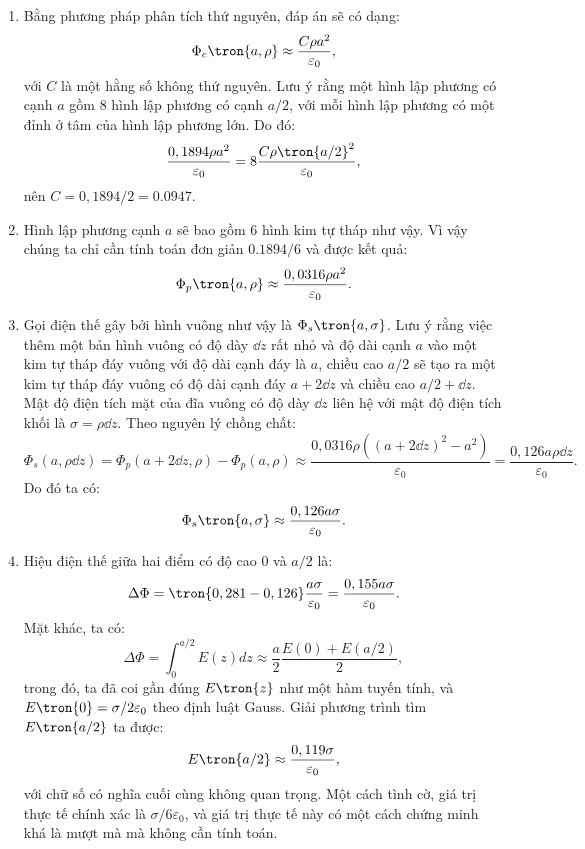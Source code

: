 \begin{loigiai}

\begin{enumerate}[1)]

\item Bằng phương pháp phân tích thứ nguyên, đáp án sẽ có dạng:
$$\Phi_c\tron{a,\rho}\approx\dfrac{C\rho a^2}{\varepsilon_0},$$
với $C$ là một hằng số không thứ nguyên. Lưu ý rằng một hình lập phương có cạnh $a$ gồm $8$ hình lập phương có cạnh $a/2$, với mỗi hình lập phương có một đỉnh ở tâm của hình lập phương lớn. Do đó:
$$\dfrac{{0,1894\rho {a^2}}}{{{\varepsilon_0}}}=8\dfrac{C\rho \tron{a/2}^2}{\varepsilon_0},$$
nên $C=0,1894/2=0.0947.$
\item Hình lập phương cạnh $a$ sẽ bao gồm $6$ hình kim tự tháp như vậy. Vì vậy chúng ta chỉ cần tính toán đơn giản $0.1894/6$ và được kết quả:
$$\Phi_p\tron{a,\rho}  \approx \dfrac{{0,0316\rho {a^2}}}{{{\varepsilon_0}}}.$$
\item Gọi điện thế gây bởi hình vuông như vậy là $\Phi_s\tron{a,\sigma}$. Lưu ý rằng việc thêm một bản hình vuông có độ dày $\dd z$ rất nhỏ và độ dài cạnh $a$ vào một kim tự tháp đáy vuông với độ dài cạnh đáy là $a$, chiều cao $a/2$ sẽ tạo ra một kim tự tháp đáy vuông có độ dài cạnh đáy $a+2\dd z$ và chiều cao $a/2+\dd z.$\\
Mật độ điện tích mặt của đĩa vuông có độ dày $\dd z$ liên hệ với mật độ điện tích khối là $\sigma=\rho \dd z$. Theo nguyên lý chồng chất:
$$\Phi_{s}(a, \rho \dd z)=\Phi_{p}(a+2 \dd z, \rho)-\Phi_{p}(a, \rho) \approx \frac{0,0316 \rho\left((a+2 \dd z)^{2}-a^{2}\right)}{\varepsilon_{0}}=\frac{0,126 a \rho \dd z}{\varepsilon_{0}}.$$
Do đó ta có:
$$\Phi_s\tron{a,\sigma}\approx\dfrac{0,126a\sigma}{\varepsilon_0}.$$
\item Hiệu điện thế giữa hai điểm có độ cao $0$ và $a/2$ là:
$$\Delta\Phi = \tron{0,281-0,126}\dfrac{a\sigma}{\varepsilon_0}=\dfrac{0,155a\sigma}{\varepsilon_0}.$$
Mặt khác, ta có:
$$\Delta \Phi=\int_{0}^{a / 2} E(z) d z \approx \dfrac{a}{2} \dfrac{E(0)+E(a / 2)}{2},$$
trong đó, ta đã coi gần đúng $E\tron{z}$ như một hàm tuyến tính, và $E\tron{0}=\sigma/2\varepsilon_0$ theo định luật Gauss. Giải phương trình tìm $E\tron{a/2}$ ta được:
$$E\tron{a/2}\approx\dfrac{0,119\sigma}{\varepsilon_0},$$
với chữ số có nghĩa cuối cùng không quan trọng. Một cách tình cờ, giá trị thực tế chính xác là $\sigma/6\varepsilon_0$, và giá trị thực tế này có một cách chứng minh khá là mượt mà mà không cần tính toán.
\end{enumerate}
\end{loigiai}


